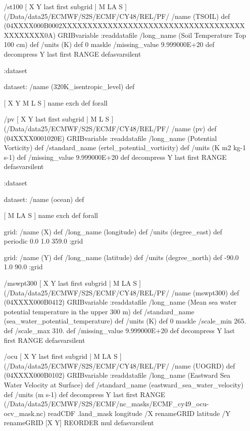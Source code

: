 \begin{ingrid}
/st100 { [ X Y last first subgrid | M LA S ] (/Data/data25/ECMWF/S2S/ECMF/CY48/REL/PF/%
/name (TSOIL) def
(04XXXX000B0002XXXXXXXXXXXXXXXXXXXXXXXXXXXXXXXXXXXXXXXXXXXX0A) GRIBvariable
:readdatafile
/long_name (Soil Temperature Top 100 cm) def
/units (K) def
0 maskle
/missing_value 9.999000E+20 def
decompress
Y last first RANGE
} defasvarsilent

:dataset

dataset:
/name (320K_isentropic_level) def

[ X Y M L S ] { name exch def } forall

/pv { [ X Y last first subgrid | M L S ] (/Data/data25/ECMWF/S2S/ECMF/CY48/REL/PF/%
/name (pv) def
(04XXXX0001020E) GRIBvariable
:readdatafile
/long_name (Potential Vorticity) def
/standard_name (ertel_potential_vorticity) def
/units (K m2 kg-1 s-1) def
/missing_value 9.999000E+20 def
decompress
Y last first RANGE
} defasvarsilent

:dataset

dataset:
/name (ocean) def

[ M LA S ] {name exch def } forall

grid:
/name (X) def
/long_name (longitude) def
/units (degree_east) def
periodic
0.0 1.0 359.0
:grid

grid:
/name (Y) def
/long_name (latitude) def
/units (degree_north) def
-90.0 1.0 90.0
:grid

/mswpt300 { [ X Y last first subgrid | M LA S ] (/Data/data25/ECMWF/S2S/ECMF/CY48/REL/PF/%
/name (mswpt300) def
(04XXXX000B0412) GRIBvariable
:readdatafile
/long_name (Mean sea water potential temperature in the upper 300 m) def
/standard_name (sea_water_potential_temperature) def
/units (K) def
0 maskle
/scale_min 265. def
/scale_max 310. def
/missing_value 9.999000E+20 def
decompress
Y last first RANGE
} defasvarsilent

/ocu { [ X Y last first subgrid | M LA S ] (/Data/data25/ECMWF/S2S/ECMF/CY48/REL/PF/%
/name (UOGRD) def
(04XXXX000B0102) GRIBvariable
:readdatafile
/long_name (Eastward Sea Water Velocity at Surface) def
/standard_name (eastward_sea_water_velocity) def
/units (m s-1) def
decompress
  Y last first RANGE
  (/Data/data25/ECMWF/S2S/ECMF/nc_masks/ECMF_cy49_ocu-ocv_mask.nc) readCDF .land_mask
    longitude /X renameGRID
    latitude /Y renameGRID
     [X Y] REORDER
 mul
} defasvarsilent


\end{ingrid}
